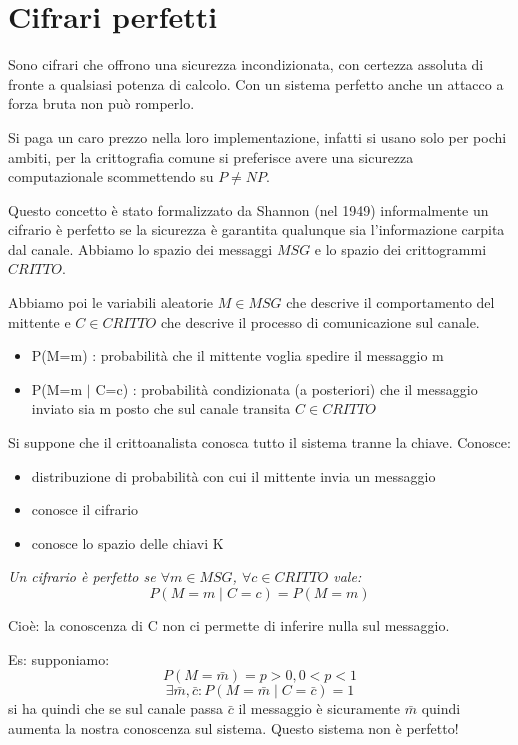 \section{Cifrari perfetti}
Sono cifrari che offrono una sicurezza incondizionata, con certezza assoluta di fronte a qualsiasi potenza di calcolo.
Con un sistema perfetto anche un attacco a forza bruta non può romperlo.

Si paga un caro prezzo nella loro implementazione, infatti si usano solo per pochi ambiti,
per la crittografia comune si preferisce avere una sicurezza computazionale scommettendo su $P \neq NP$.

Questo concetto è stato formalizzato da Shannon (nel 1949) informalmente un
cifrario è perfetto se la sicurezza è garantita qualunque sia l'informazione carpita dal canale.
Abbiamo lo spazio dei messaggi $MSG$ e lo spazio dei crittogrammi $CRITTO$.

Abbiamo poi le variabili aleatorie $M \in MSG$ che descrive il comportamento del mittente e $C \in CRITTO$ che descrive il processo di comunicazione sul canale.

\begin{itemize}
    \item P(M=m) : probabilità che il mittente voglia spedire il messaggio m
    \item P(M=m $ \mid $ C=c) : probabilità condizionata (a posteriori) che il messaggio inviato sia m posto che sul canale transita $C \in CRITTO$
\end{itemize}

Si suppone che il crittoanalista conosca tutto il sistema tranne la chiave. Conosce:
\begin{itemize}
    \item distribuzione di probabilità con cui il mittente invia un messaggio
    \item conosce il cifrario
    \item conosce lo spazio delle chiavi K
\end{itemize}

\emph{Un cifrario è perfetto se $\forall m \in MSG$, $\forall c \in CRITTO$ vale:}
$$ P(M=m  \mid  C=c) = P(M=m) $$

Cioè: la conoscenza di C non ci permette di inferire nulla sul messaggio.

Es: supponiamo: 
$$P(M=\bar{m}) = p > 0, 0 < p < 1$$
$$\exists \bar{m}, \bar{c} : P(M=\bar{m} \mid C=\bar{c}) = 1$$
si ha quindi che se sul canale passa $\bar{c}$ il messaggio è sicuramente $\bar{m}$ quindi aumenta la nostra conoscenza sul sistema. Questo sistema non è perfetto!

